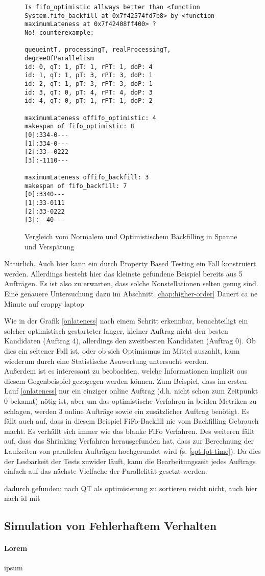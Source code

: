 \begin{figure}
\centering
\begin{verbatim}
Is fifo_optimistic allways better than <function System.fifo_backfill at 0x7f42574fd7b8> by <function maximumLateness at 0x7f42408ff400> ?
No! counterexample:

queueintT, processingT, realProcessingT, degreeOfParallelism
id: 0, qT: 1, pT: 1, rPT: 1, doP: 4
id: 1, qT: 1, pT: 3, rPT: 3, doP: 1
id: 2, qT: 1, pT: 3, rPT: 3, doP: 1
id: 3, qT: 0, pT: 4, rPT: 4, doP: 3
id: 4, qT: 0, pT: 1, rPT: 1, doP: 2

maximumLateness offifo_optimistic: 4
makespan of fifo_optimistic: 8
[0]:334-0---
[1]:334-0---
[2]:33--0222
[3]:-1110---

maximumLateness offifo_backfill: 3
makespan of fifo_backfill: 7
[0]:3340---
[1]:33-0111
[2]:33-0222
[3]:--40---
\end{verbatim}
\caption{Vergleich vom Normalem und Optimistischem Backfilling in Spanne und Verspätung}
\label{onlatenessmakespan}
\end{figure}

Natürlich. Auch hier kann ein durch Property Based Testing ein Fall konstruiert werden. Allerdings besteht hier das kleinste gefundene Beispiel bereits aus 5 Aufträgen. Es ist also zu erwarten, dass solche Konstellationen selten genug sind. Eine genauere Untersuchung dazu im Abschnitt \ref{chap:higher-order}
Dauert ca ne Minute auf crappy laptop\\
\FloatBarrier

Wie in der Grafik \ref{onlateness} nach einem Schritt erkennbar, benachteiligt ein solcher optimistisch gestarteter langer, kleiner Auftrag nicht den besten Kandidaten (Auftrag 4), allerdings den zweitbesten Kandidaten (Auftrag 0). Ob dies ein seltener Fall ist, oder ob sich Optimismus im Mittel auszahlt, kann wiederum durch eine Statistische Asuwertung untersucht werden.\\

Außerdem ist es interessant zu beobachten, welche Informationen implizit aus diesem Gegenbeispiel gezogegen werden können. Zum Beispiel, dass im ersten Lauf \ref{onlateness} nur ein einziger online Auftrag (d.h. nicht schon zum Zeitpunkt 0 bekannt) nötig ist, aber um das optimistische Verfahren in beiden Metriken zu schlagen, werden 3 online Aufträge sowie ein zusätzlicher Auftrag benötigt. Es fällt auch auf, dass in diesem Beispiel FiFo-Backfill nie vom Backfilling Gebrauch macht. Es verhällt sich immer wie das blanke FiFo Verfahren. 
Des weiteren fällt auf, dass das Shrinking Verfahren herausgefunden hat, dass zur Berechnung der Laufzeiten von parallelen Aufträgen hochgerundet wird (s. \ref{spt-lpt-time}). Da dies der Lesbarkeit der Tests zuwider läuft, kann die Bearbeitungszeit jedes Auftrags einfach auf das nächste Vielfache der Parallelität gesetzt werden.

dadurch gefunden: nach QT als optimisierung zu sortieren reicht nicht, auch hier nach id mit

\subsection{Simulation von Fehlerhaftem Verhalten}
\label{simErrors}

\paragraph{Lorem}
ipsum